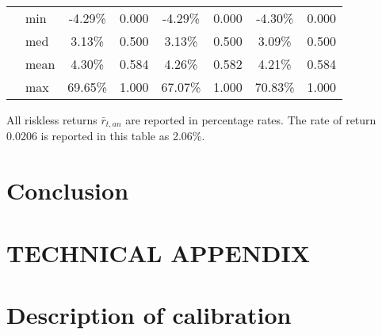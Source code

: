 \documentclass[letterpaper,12pt]{article}
\theoremstyle{definition}
\begin{document}
\begin{spacing}{1.5}
\begin{table}[htbp]
\begin{threeparttable}
\begin{tabular}{>{\small}c >{\small}l| >{\small}c >{\small}c| >{\small}c >{\small}c| >{\small}c >{\small}c}
      & min & -4.29\% & 0.000 & -4.29\% & 0.000 & -4.30\% & 0.000 \\
      & med & 3.13\% & 0.500 & 3.13\% & 0.500 & 3.09\% & 0.500 \\
      & mean & 4.30\% & 0.584 & 4.26\% & 0.582 & 4.21\% & 0.584 \\
      & max & 69.65\% & 1.000 & 67.07\% & 1.000 & 70.83\% & 1.000 \\
      \hline\hline
    \end{tabular}
    \begin{tablenotes}
      \scriptsize{\item[]All riskless returns $\bar{r}_{t,an}$ are reported in percentage rates. The rate of return 0.0206 is reported in this table as 2.06\%.}
    \end{tablenotes}
    \end{threeparttable}
  \end{table}


\section{Conclusion}\label{SecConclusion}


\end{spacing}




\newpage
\renewcommand{\theequation}{T.\arabic{section}.\arabic{equation}}
\renewcommand{\thesection}{T-\arabic{section}}   %

\setcounter{equation}{0}                         %
\setcounter{section}{0}                          %
\section*{TECHNICAL APPENDIX}

\setcounter{equation}{0}                         %
\section{Description of calibration}\label{SecTAppCalib}
\end{document}
